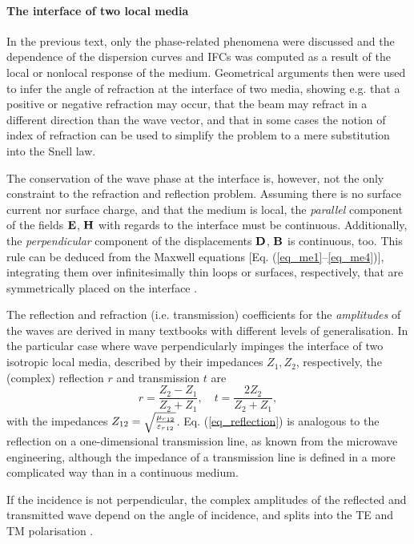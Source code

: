 \paragraph{The interface of two local media} %
In the previous text, only the phase-related phenomena were discussed and the dependence of the dispersion curves and IFCs was computed as a result of the local or nonlocal response of the medium. Geometrical arguments then were used to infer the angle of refraction at the interface of two media, showing e.g. that a positive or negative refraction may occur, that the beam may refract in a different direction than the wave vector, and that in some cases the notion of index of refraction can be used to simplify the problem to a mere substitution into the Snell law.

The conservation of the wave phase at the interface is, however, not the only constraint to the refraction and reflection problem. Assuming there is no surface current nor surface charge, and that the medium is local, the \textit{parallel} component of the fields $\mathbf{E}$, $\mathbf{H}$ with regards to the interface must be continuous. Additionally, the \textit{perpendicular} component of the displacements $\mathbf{D}$, $\mathbf{B}$ is continuous, too. This rule can be deduced from the Maxwell equations [Eq.  (\ref{eq_me1}--\ref{eq_me4})], integrating them over infinitesimally thin loops or surfaces, respectively, that are symmetrically placed on the interface \cite[pp. 26-29]{klingshirn2007semiconductor}. 

The reflection and refraction (i.e. transmission) coefficients for the \textit{amplitudes} of the waves are derived in many textbooks  with different levels of generalisation.  
In the particular case where wave perpendicularly impinges the interface of two isotropic local media, described by their impedances $Z_1, Z_2$, respectively, the (complex) reflection $r$ and transmission $t$ are
\begin{equation} r = \frac{Z_2 - Z_1}{Z_2+Z_1}, \quad t = \frac{2 Z_2}{Z_2 + Z_1}, \label{eq_reflection}\end{equation}
with the impedances
$Z_{12} = \sqrt{\frac{{\mu_r}_{12}}{{\varepsilon_r}_{12}  }  }$.
Eq. (\ref{eq_reflection}) is analogous to the reflection on a one-dimensional transmission line, as known from the microwave engineering, although the impedance of a transmission line is defined in a more complicated way than in a continuous medium.

If the incidence is not perpendicular, the complex amplitudes of the reflected and transmitted wave depend on the angle of incidence, and splits into the TE and TM polarisation \cite[p. 38]{born1999book}.  %

